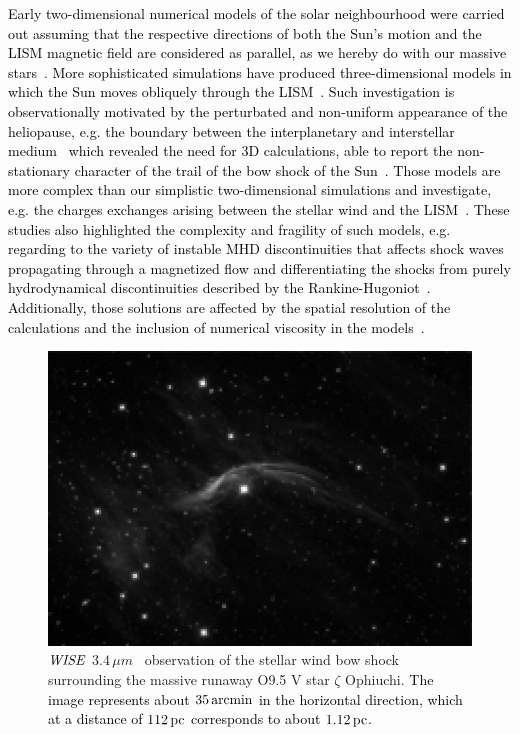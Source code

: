 \documentclass[useAMS,usenatbib]{mn2e}
\begin{document}
\textcolor{black}{
Early two-dimensional numerical models of the solar neighbourhood were carried out assuming 
that the respective directions of both the Sun's motion and the LISM magnetic 
field are considered as parallel, as we hereby do with our massive 
stars~\citep{pogorelov_JGR_103_1998}. More sophisticated simulations have produced three-dimensional 
models in which the Sun moves obliquely through the LISM~\citep[see, 
e.g.][]{baranov_astl_22_1996,boley_apj_776_2013}. Such investigation is  observationally motivated 
by the perturbated and non-uniform appearance of the heliopause, e.g. the 
boundary between the interplanetary and interstellar 
medium~\citep{kawamura_2010} which revealed the need for 3D calculations,  able 
to report the non-stationary character of the trail of the bow shock of the 
Sun~\citep{washimi_ssrv_78_1996,linde_jgr_103_1998,ratkiewicz_aa_335_1998}. 
Those models are more complex than our simplistic two-dimensional simulations 
and investigate, e.g. the charges exchanges arising between the stellar wind 
and the LISM~\citep{fitzenreiter_jgr_95_1990}. These studies also 
highlighted the complexity and fragility of such models, e.g. regarding to the 
variety of instable MHD discontinuities that affects shock waves propagating 
through a magnetized flow and differentiating the shocks from purely 
hydrodynamical discontinuities described by the Rankine-Hugoniot~\citep[see 
also][]{sterck_phpl_1998,sterck_aa_343_1999}. Additionally, those solutions are 
affected by the spatial resolution of the calculations and the inclusion of 
numerical viscosity in the models~\citep[][and references 
therein]{lopez_angeo_29_2011,wang_jgra_119_2014}. 
}


\begin{figure}
	\begin{minipage}[b]{ 0.76\textwidth}
		\includegraphics[width=1.0\textwidth]{./bs.eps}
	\end{minipage} 
	\caption{
	         ${\it WISE}$ $3.4\, \mu m$~\citep[band W1, ][]{wright_aj_140_2010} 
	         observation of the stellar wind bow shock surrounding the massive 
	         runaway O9.5 V star $\zeta$ Ophiuchi. \textcolor{black}{The image 
	         represents about $35\, \rm arcmin$ in the horizontal direction, 
	         which at a distance of $112\, \rm pc$ 
	         corresponds to about $1.12\, \rm pc$.} 
		 }
	\label{fig:obs}  
\end{figure}
\end{document}
